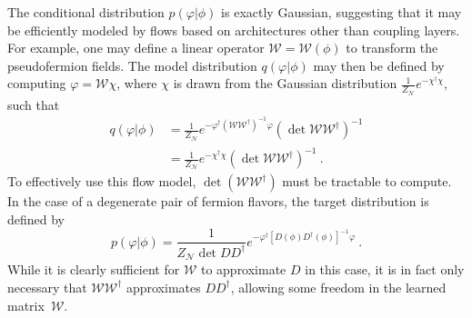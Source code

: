 \documentclass[aps,prd,twocolumn,nofootinbib,superscriptaddress,preprintnumbers]{revtex4-1}
\begin{document}
The conditional distribution $p(\varphi|\phi)$ is exactly Gaussian, suggesting that it may be efficiently modeled by flows based on architectures other than coupling layers. For example, one may define a linear operator $\mathcal{W}=\mathcal{W}(\phi)$ to transform the pseudofermion fields. The model distribution $q(\varphi| \phi)$ may then be defined by computing ${\varphi = \mathcal{W}\chi}$, where $\chi$ is drawn from the Gaussian distribution $\frac{1}{Z_{\mathcal{N}}}e^{-\chi^\dag \chi}$, such that
%
\begin{equation}
\label{eq:linear-flow}
\begin{aligned}
    q(\varphi|\phi) &= \frac{1}{Z_\mathcal{N}}e^{-\varphi^\dag (\mathcal{W} \mathcal{W}^\dag)^{-1} \varphi} (\det \mathcal{W} \mathcal{W}^\dag)^{-1} \\
    &= \frac{1}{Z_\mathcal{N}}e^{-\chi^\dag \chi} (\det \mathcal{W} \mathcal{W}^\dag)^{-1}\ .
\end{aligned}
\end{equation}
%
To effectively use this flow model, $\det(\mathcal{W} \mathcal{W}^\dag)$ must be tractable to compute. In the case of a degenerate pair of fermion flavors, the target distribution is defined by
%
\begin{equation}
    p(\varphi|\phi) = \frac{1}{Z_{\mathcal{N}} \det{DD^\dag}} e^{-\varphi^\dag [D(\phi) D^\dag(\phi)]^{-1} \varphi}\ .
\end{equation}
%
While it is clearly sufficient for $\mathcal{W}$ to approximate $D$ in this case, it is in fact only necessary that $\mathcal{W}\mathcal{W}^\dag$ approximates $DD^\dag$, allowing some freedom in the learned matrix~$\mathcal{W}$.
\end{document}
